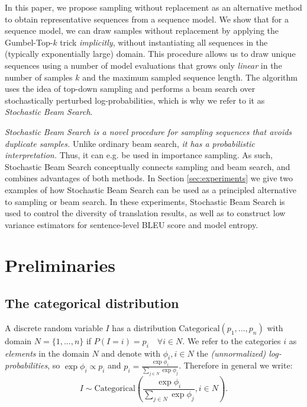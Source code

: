In this paper, we propose sampling without replacement as an alternative method to obtain representative sequences from a sequence model. We show that for a sequence model, we can draw samples without replacement by applying the Gumbel-Top-$k$ trick \emph{implicitly}, without instantiating all sequences in the (typically exponentially large) domain. This procedure allows us to draw unique sequences using a number of model evaluations that grows only \emph{linear} in the number of samples $k$ and the maximum sampled sequence length. The algorithm uses the idea of top-down sampling \citep{maddison2014sampling} and performs a beam search over stochastically perturbed log-probabilities, which is why we refer to it as \emph{Stochastic Beam Search}. 

\textit{Stochastic Beam Search is a novel procedure for sampling sequences that avoids duplicate samples.} Unlike ordinary beam search, \textit{it has a probabilistic interpretation.} Thus, it can e.g. be used in importance sampling. As such, Stochastic Beam Search conceptually connects sampling and beam search, and combines advantages of both methods. In Section \ref{sec:experiments} we give two examples of how Stochastic Beam Search can be used as a principled alternative to sampling or beam search. In these experiments, Stochastic Beam Search is used to control the diversity of translation results, as well as to construct low variance estimators for sentence-level BLEU score and model entropy.

\section{Preliminaries}
\label{sec:preliminaries}
\subsection{The categorical distribution}
A discrete random variable $I$ has a distribution $\text{Categorical}(p_1, ..., p_n)$ with domain $N = \{1, ..., n\}$ if $P(I=i) = p_i \quad \forall i \in N$.
We refer to the categories $i$ as \emph{elements} in the domain $N$ and denote with $\phi_i, i \in N$ the \emph{(unnormalized) log-probabilities}, so $\exp{\phi_i} \propto p_i$ and $p_i = \frac{\exp{\phi_i}}{\sum_{j \in N} \exp{\phi_j}}$. Therefore in general we write:
\begin{equation}
\label{eq:categorical}
    I \sim \text{Categorical} \left( \frac{\exp{\phi_i}}{\sum_{j \in N} \exp{\phi_j}}, i \in N \right).
\end{equation}

